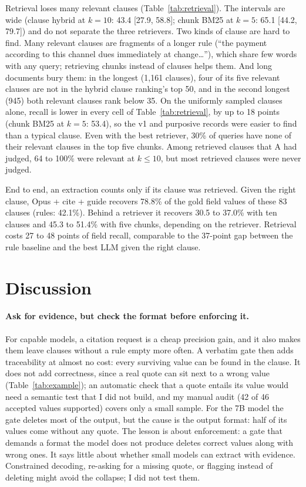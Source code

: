 \documentclass[11pt,a4paper]{article}
\begin{document}
Retrieval loses many relevant clauses (Table~\ref{tab:retrieval}). The intervals are wide (clause hybrid at $k=10$: 43.4 [27.9, 58.8]; chunk BM25 at $k=5$: 65.1 [44.2, 79.7]) and do not separate the three retrievers. Two kinds of clause are hard to find. Many relevant clauses are fragments of a longer rule (``the payment according to this channel dues immediately at change\ldots''), which share few words with any query; retrieving chunks instead of clauses helps them. And long documents bury them: in the longest (1,161 clauses), four of its five relevant clauses are not in the hybrid clause ranking's top 50, and in the second longest (945) both relevant clauses rank below 35. On the uniformly sampled clauses alone, recall is lower in every cell of Table~\ref{tab:retrieval}, by up to 18 points (chunk BM25 at $k=5$: 53.4), so the v1 and purposive records were easier to find than a typical clause. Even with the best retriever, 30\% of queries have none of their relevant clauses in the top five chunks. Among retrieved clauses that A had judged, 64 to 100\% were relevant at $k \leq 10$, but most retrieved clauses were never judged.

End to end, an extraction counts only if its clause was retrieved. Given the right clause, Opus + cite + guide recovers 78.8\% of the gold field values of these 83 clauses (rules: 42.1\%). Behind a retriever it recovers 30.5 to 37.0\% with ten clauses and 45.3 to 51.4\% with five chunks, depending on the retriever. Retrieval costs 27 to 48 points of field recall, comparable to the 37-point gap between the rule baseline and the best LLM given the right clause.

\section{Discussion}

\paragraph{Ask for evidence, but check the format before enforcing it.} For capable models, a citation request is a cheap precision gain, and it also makes them leave clauses without a rule empty more often. A verbatim gate then adds traceability at almost no cost: every surviving value can be found in the clause. It does not add correctness, since a real quote can sit next to a wrong value (Table~\ref{tab:example}); an automatic check that a quote entails its value would need a semantic test that I did not build, and my manual audit (42 of 46 accepted values supported) covers only a small sample. For the 7B model the gate deletes most of the output, but the cause is the output format: half of its values come without any quote. The lesson is about enforcement: a gate that demands a format the model does not produce deletes correct values along with wrong ones. It says little about whether small models can extract with evidence. Constrained decoding, re-asking for a missing quote, or flagging instead of deleting might avoid the collapse; I did not test them.
\end{document}
